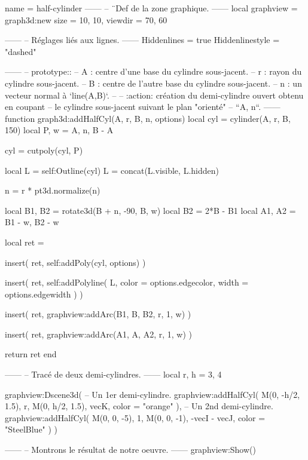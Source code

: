 \documentclass{standalone}
\begin{document}
\begin{luadraw}{name = half-cylinder}
------
-- ¨Def de la zone graphique.
------
local graphview = graph3d:new{
  size    = {10, 10},
  viewdir = {70, 60}
}

------
-- Réglages liés aux lignes.
------
Hiddenlines     = true
Hiddenlinestyle = "dashed"

------
-- prototype::
--     A : centre d'une base du cylindre sous-jacent.
--     r : rayon du cylindre sous-jacent.
--     B : centre de l'autre base du cylindre sous-jacent.
--     n : un vecteur normal à `line(A,B)`.
--
--     :action: création du demi-cylindre ouvert obtenu en coupant
--              le cylindre sous-jacent suivant le plan "orienté"
--              ``{A, n}``.
------
function graph3d:addHalfCyl(A, r, B, n, options)
  local cyl  = cylinder(A, r, B, 150)
  local P, w = {A, n}, B - A

  cyl = cutpoly(cyl, P)

  local L = self:Outline(cyl)
  L = concat(L.visible, L.hidden)

  n = r * pt3d.normalize(n)

  local B1, B2 = rotate3d(B + n, -90, {B, w})
  local B2     = 2*B - B1
  local A1, A2 = B1 - w, B2 - w

  local ret = {}

  insert(
    ret,
    self:addPoly(cyl, options)
  )

  insert(
    ret,
    self:addPolyline(
      L,
      {
        color = options.edgecolor,
        width = options.edgewidth
      }
    )
  )

  insert(
    ret,
    graphview:addArc(B1, B, B2, r, 1, w)
  )

  insert(
    ret,
    graphview:addArc(A1, A, A2, r, 1, w)
  )

  return ret
end

------
-- Tracé de deux demi-cylindres.
------
local r, h = 3, 4

graphview:Dscene3d(
-- Un 1er demi-cylindre.
  graphview:addHalfCyl(
    M(0, -h/2, 1.5), r,
    M(0, h/2, 1.5), vecK,
    {color = "orange"}
  ),
-- Un 2nd demi-cylindre.
  graphview:addHalfCyl(
    M(0, 0, -5), 1,
    M(0, 0, -1), -vecI - vecJ,
    {color = "SteelBlue"}
  )
)

------
-- Montrons le résultat de notre oeuvre.
------
graphview:Show()
\end{luadraw}
\end{document}
